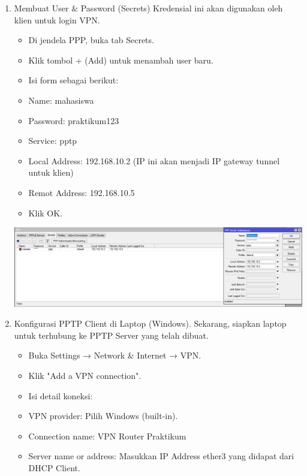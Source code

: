 \begin{enumerate}
\begin{enumerate}
\begin{center}
        \end{center}
        \item Membuat User \& Password (Secrets) Kredensial ini akan digunakan oleh klien untuk login VPN.
        \begin{itemize}
            \item Di jendela PPP, buka tab Secrets.
            \item Klik tombol + (Add) untuk menambah user baru.
            \item Isi form sebagai berikut:
            \item Name: mahasiswa
            \item Password: praktikum123
            \item Service: pptp
            \item Local Address: 192.168.10.2 (IP ini akan menjadi IP gateway tunnel untuk klien)
            \item Remot Address: 192.168.10.5
            \item Klik OK.
        \end{itemize}
        \begin{center}
            \includegraphics[scale=0.9]{P1/img/9 Konfigurasi Membuat User & Password (Secrets) Kredensial.png}        
        \end{center}
        \item Konfigurasi PPTP Client di Laptop (Windows). Sekarang, siapkan laptop untuk terhubung ke PPTP Server yang telah dibuat.
        \begin{itemize}
            \item Buka Settings → Network \& Internet → VPN.
            \item Klik "Add a VPN connection".
            \item Isi detail koneksi:
            \item VPN provider: Pilih Windows (built-in).
            \item Connection name: VPN Router Praktikum
            \item Server name or address: Masukkan IP Address ether3 yang didapat dari DHCP Client.

\end{itemize}
\end{enumerate}
\end{enumerate}
